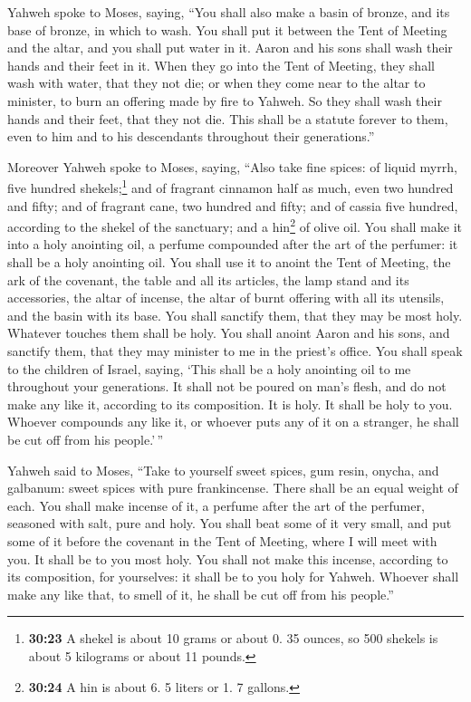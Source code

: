  Yahweh spoke to Moses, saying,  ``You
shall also make a basin of bronze, and its base of bronze, in which to
wash. You shall put it between the Tent of Meeting and the altar, and
you shall put water in it.  Aaron and his sons shall wash
their hands and their feet in it.  When they go into the
Tent of Meeting, they shall wash with water, that they not die; or when
they come near to the altar to minister, to burn an offering made by
fire to Yahweh.  So they shall wash their hands and their
feet, that they not die. This shall be a statute forever to them, even
to him and to his descendants throughout their generations.''

 Moreover Yahweh spoke to Moses, saying, 
``Also take fine spices: of liquid myrrh, five hundred
shekels;\footnote{\textbf{30:23} A shekel is about 10 grams or about 0.
  35 ounces, so 500 shekels is about 5 kilograms or about 11 pounds.}
and of fragrant cinnamon half as much, even two hundred and fifty; and
of fragrant cane, two hundred and fifty;  and of cassia
five hundred, according to the shekel of the sanctuary; and a
hin\footnote{\textbf{30:24} A hin is about 6. 5 liters or 1. 7 gallons.}
of olive oil.  You shall make it into a holy anointing
oil, a perfume compounded after the art of the perfumer: it shall be a
holy anointing oil.  You shall use it to anoint the Tent
of Meeting, the ark of the covenant,  the table and all
its articles, the lamp stand and its accessories, the altar of incense,
 the altar of burnt offering with all its utensils, and
the basin with its base.  You shall sanctify them, that
they may be most holy. Whatever touches them shall be holy.
 You shall anoint Aaron and his sons, and sanctify them,
that they may minister to me in the priest's office.  You
shall speak to the children of Israel, saying, `This shall be a holy
anointing oil to me throughout your generations.  It
shall not be poured on man's flesh, and do not make any like it,
according to its composition. It is holy. It shall be holy to you.
 Whoever compounds any like it, or whoever puts any of it
on a stranger, he shall be cut off from his people.'\,''

 Yahweh said to Moses, ``Take to yourself sweet spices,
gum resin, onycha, and galbanum: sweet spices with pure frankincense.
There shall be an equal weight of each.  You shall make
incense of it, a perfume after the art of the perfumer, seasoned with
salt, pure and holy.  You shall beat some of it very
small, and put some of it before the covenant in the Tent of Meeting,
where I will meet with you. It shall be to you most holy.
 You shall not make this incense, according to its
composition, for yourselves: it shall be to you holy for Yahweh.
 Whoever shall make any like that, to smell of it, he
shall be cut off from his people.''

